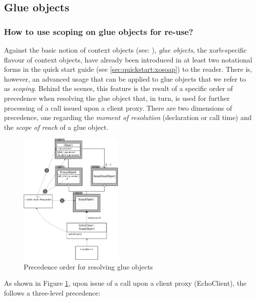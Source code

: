   \subsection{Glue objects}\label{sec:advanced:xorb:gobjects}
  
  \subsubsection{How to use scoping on glue objects for re-use?}\label{sec:advanced:xorb:gobjects:why}
  Against the basic notion of context objects (see: ), \emph{glue objects}, the xorb-specific flavour of context objects, have already been introduced in at least two notational forms in the quick start guide (see \ref{sec:quickstart:xosoap}) to the reader. There is, however, an advanced usage that can be applied to glue objects that we refer to as \emph{scoping}. Behind the scenes, this feature is the result of a specific order of precedence when resolving the glue object that, in turn, is used for further processing of a call issued upon a client proxy. There are two dimensions of precedence, one regarding the \emph{moment of resolution} (declaration or call time) and the \emph{scope of reach} of a glue object.
  \begin{figure}[htbp]
\begin{center}
\includegraphics[width=0.45\textwidth]{img/scoping-glue-objects-structure.png}
\caption{Precedence order for resolving glue objects}
\label{fig:advanced:scoping:1}
\end{center}
\end{figure}
As shown in Figure \ref{fig:advanced:scoping:1}, upon issue of a call upon a client proxy (EchoClient), the  follows a three-level precedence:
